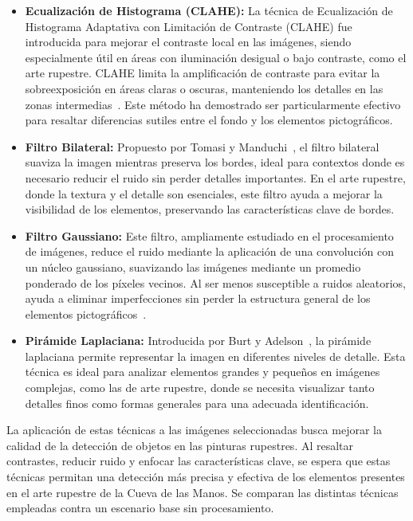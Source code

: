 \begin{itemize}
    \item \textbf{Ecualización de Histograma (CLAHE):}
    La técnica de Ecualización de Histograma Adaptativa con Limitación de Contraste (CLAHE) fue introducida para mejorar el contraste local en las imágenes, siendo especialmente útil en áreas con iluminación desigual o bajo contraste, como el arte rupestre.
    CLAHE limita la amplificación de contraste para evitar la sobreexposición en áreas claras o oscuras, manteniendo los detalles en las zonas intermedias~\cite{zuiderveld1994contrast}.
    Este método ha demostrado ser particularmente efectivo para resaltar diferencias sutiles entre el fondo y los elementos pictográficos.

    \item \textbf{Filtro Bilateral:}
    Propuesto por Tomasi y Manduchi~\cite{tomasi1998bilateral}, el filtro bilateral suaviza la imagen mientras preserva los bordes, ideal para contextos donde es necesario reducir el ruido sin perder detalles importantes.
    En el arte rupestre, donde la textura y el detalle son esenciales, este filtro ayuda a mejorar la visibilidad de los elementos, preservando las características clave de bordes.

    \item \textbf{Filtro Gaussiano:}
    Este filtro, ampliamente estudiado en el procesamiento de imágenes, reduce el ruido mediante la aplicación de una convolución con un núcleo gaussiano, suavizando las imágenes mediante un promedio ponderado de los píxeles vecinos.
    Al ser menos susceptible a ruidos aleatorios, ayuda a eliminar imperfecciones sin perder la estructura general de los elementos pictográficos~\cite{gonzalesWood}.

    \item \textbf{Pirámide Laplaciana:}
    Introducida por Burt y Adelson~\cite{burt1983laplacian}, la pirámide laplaciana permite representar la imagen en diferentes niveles de detalle.
    Esta técnica es ideal para analizar elementos grandes y pequeños en imágenes complejas, como las de arte rupestre, donde se necesita visualizar tanto detalles finos como formas generales para una adecuada identificación.
\end{itemize}

La aplicación de estas técnicas a las imágenes seleccionadas busca mejorar la calidad de la detección de objetos en las pinturas rupestres.
Al resaltar contrastes, reducir ruido y enfocar las características clave, se espera que estas técnicas permitan una detección más precisa y efectiva de los elementos presentes en el arte rupestre de la Cueva de las Manos.
Se comparan las distintas técnicas empleadas contra un escenario base sin procesamiento.


